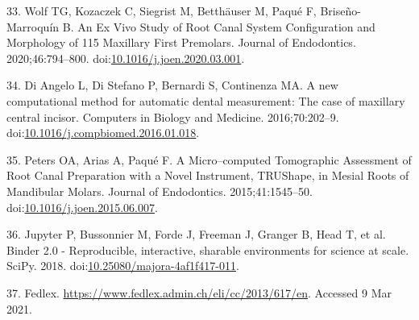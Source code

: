 \documentclass[
  american,
]{article}
\newenvironment{cslreferences}%
  {}%
  {\par}
\begin{document}
\begin{cslreferences}
\leavevmode\hypertarget{ref-jsWNcnau}{}%
33. Wolf TG, Kozaczek C, Siegrist M, Betthäuser M, Paqué F, Briseño-Marroquín B. An Ex Vivo Study of Root Canal System Configuration and Morphology of 115 Maxillary First Premolars. Journal of Endodontics. 2020;46:794--800. doi:\href{https://doi.org/10.1016/j.joen.2020.03.001}{10.1016/j.joen.2020.03.001}.

\leavevmode\hypertarget{ref-1Egw08k0d}{}%
34. Di Angelo L, Di Stefano P, Bernardi S, Continenza MA. A new computational method for automatic dental measurement: The case of maxillary central incisor. Computers in Biology and Medicine. 2016;70:202--9. doi:\href{https://doi.org/10.1016/j.compbiomed.2016.01.018}{10.1016/j.compbiomed.2016.01.018}.

\leavevmode\hypertarget{ref-RxErLYuw}{}%
35. Peters OA, Arias A, Paqué F. A Micro--computed Tomographic Assessment of Root Canal Preparation with a Novel Instrument, TRUShape, in Mesial Roots of Mandibular Molars. Journal of Endodontics. 2015;41:1545--50. doi:\href{https://doi.org/10.1016/j.joen.2015.06.007}{10.1016/j.joen.2015.06.007}.

\leavevmode\hypertarget{ref-Q20Bxdsr}{}%
36. Jupyter P, Bussonnier M, Forde J, Freeman J, Granger B, Head T, et al. Binder 2.0 - Reproducible, interactive, sharable environments for science at scale. SciPy. 2018. doi:\href{https://doi.org/10.25080/majora-4af1f417-011}{10.25080/majora-4af1f417-011}.

\leavevmode\hypertarget{ref-10OKzEtEb}{}%
37. Fedlex. \url{https://www.fedlex.admin.ch/eli/cc/2013/617/en}. Accessed 9 Mar 2021.
\end{cslreferences}
\end{document}
